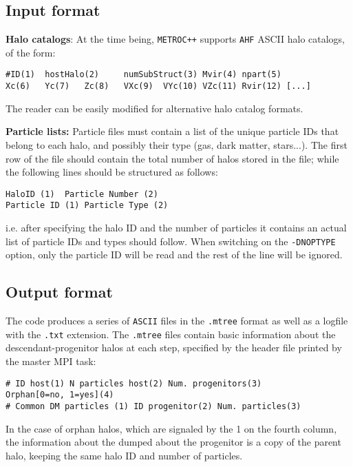 \documentclass{article}
\begin{document}
\subsection{Input format}

\textbf{Halo catalogs}:
At the time being, \texttt{METROC++} supports \texttt{AHF} ASCII halo catalogs, of the form:
\begin{verbatim}
#ID(1)  hostHalo(2)     numSubStruct(3) Mvir(4) npart(5)        
Xc(6)   Yc(7)   Zc(8)   VXc(9)  VYc(10) VZc(11) Rvir(12) [...]
\end{verbatim} 
The reader can be easily modified for alternative halo catalog formats.


\textbf{Particle lists:}
Particle files must contain a list of the unique particle IDs that belong to each halo, and possibly their type 
(gas, dark matter, stars...). The first row of the file should contain the total number of halos stored in the
file; while the following lines should be structured as follows:

\begin{verbatim}
HaloID (1)  Particle Number (2)   
Particle ID (1) Particle Type (2)
\end{verbatim} 

\noindent
i.e. after specifying the halo ID and the number of particles it contains an actual list of particle IDs and types should follow.
When switching on the \texttt{-DNOPTYPE} option, only the particle ID will be read and the rest of the line will be ignored.



\subsection{Output format}
The code produces a series of \texttt{ASCII} files in the \texttt{.mtree} format 
as well as a logfile with the \texttt{.txt} extension.
The \texttt{.mtree} files contain basic information about the descendant-progenitor halos at each step, specified by the
header file printed by the master MPI task: \\

\begin{verbatim}
# ID host(1) N particles host(2) Num. progenitors(3)  
Orphan[0=no, 1=yes](4)
# Common DM particles (1) ID progenitor(2) Num. particles(3)
\end{verbatim} 

\noindent
In the case of orphan halos, which are signaled by the 1 on the fourth column, the information about the
dumped about the progenitor is a copy of the parent halo, keeping the same halo ID and number of particles.
\end{document}
